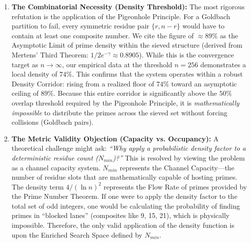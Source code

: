 \documentclass[sn-mathphys-num, pdflatex]{sn-jnl}
\begin{document}
\begin{enumerate}
    \item \textbf{The Combinatorial Necessity (Density Threshold):}
    The most rigorous refutation is the application of the Pigeonhole Principle. For a Goldbach partition to fail, every symmetric residue pair $\{r, n-r\}$ would have to contain at least one composite number. We cite the figure of $\approx 89\%$ as the Asymptotic Limit of prime density within the sieved structure (derived from Mertens' Third Theorem: $1 / 2e^{-\gamma} \approx 0.8905$). While this is the convergence target as $n \to \infty$, our empirical data at the threshold $n=256$ demonstrates a local density of $74\%$. This confirms that the system operates within a robust Density Corridor: rising from a realized floor of $74\%$ toward an asymptotic ceiling of $89\%$. Because this entire corridor is significantly above the $50\%$ overlap threshold required by the Pigeonhole Principle, it is \textit{mathematically impossible} to distribute the primes across the sieved set without forcing collisions (Goldbach pairs).

    \item \textbf{The Metric Validity Objection (Capacity vs. Occupancy):}
    A theoretical challenge might ask: \textit{``Why apply a probabilistic density factor to a deterministic residue count ($N_{min}$)?''} This is resolved by viewing the problem as a channel capacity system. $N_{min}$ represents the Channel Capacity—the number of residue slots that are mathematically capable of hosting primes. The density term $4/(\ln n)^2$ represents the Flow Rate of primes provided by the Prime Number Theorem. If one were to apply the density factor to the total set of odd integers, one would be calculating the probability of finding primes in ``blocked lanes'' (composites like 9, 15, 21), which is physically impossible. Therefore, the only valid application of the density function is upon the Enriched Search Space defined by $N_{min}$.
\end{enumerate}
\end{document}
